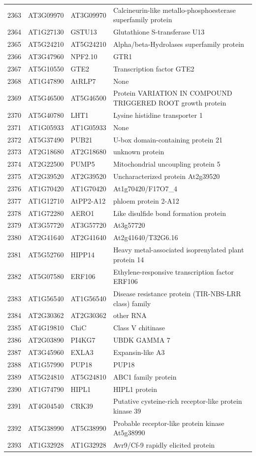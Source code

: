 \documentclass[11pt]{article}
\begin{document}
\begin{center}
\begin{tabular}{rlll}
2363 & AT3G09970 & AT3G09970 & Calcineurin-like metallo-phosphoesterase superfamily protein\\
2364 & AT1G27130 & GSTU13 & Glutathione S-transferase U13\\
2365 & AT5G24210 & AT5G24210 & Alpha/beta-Hydrolases superfamily protein\\
2366 & AT3G47960 & NPF2.10 & GTR1\\
2367 & AT5G10550 & GTE2 & Transcription factor GTE2\\
2368 & AT1G47890 & AtRLP7 & None\\
2369 & AT5G46500 & AT5G46500 & Protein VARIATION IN COMPOUND TRIGGERED ROOT growth protein\\
2370 & AT5G40780 & LHT1 & Lysine histidine transporter 1\\
2371 & AT1G05933 & AT1G05933 & None\\
2372 & AT5G37490 & PUB21 & U-box domain-containing protein 21\\
2373 & AT2G18680 & AT2G18680 & unknown protein\\
2374 & AT2G22500 & PUMP5 & Mitochondrial uncoupling protein 5\\
2375 & AT2G39520 & AT2G39520 & Uncharacterized protein At2g39520\\
2376 & AT1G70420 & AT1G70420 & At1g70420/F17O7\_4\\
2377 & AT1G12710 & AtPP2-A12 & phloem protein 2-A12\\
2378 & AT1G72280 & AERO1 & Like disulfide bond formation protein\\
2379 & AT3G57720 & AT3G57720 & At3g57720\\
2380 & AT2G41640 & AT2G41640 & At2g41640/T32G6.16\\
2381 & AT5G52760 & HIPP14 & Heavy metal-associated isoprenylated plant protein 14\\
2382 & AT5G07580 & ERF106 & Ethylene-responsive transcription factor ERF106\\
2383 & AT1G56540 & AT1G56540 & Disease resistance protein (TIR-NBS-LRR class) family\\
2384 & AT2G30362 & AT2G30362 & other RNA\\
2385 & AT4G19810 & ChiC & Class V chitinase\\
2386 & AT2G03890 & PI4KG7 & UBDK GAMMA 7\\
2387 & AT3G45960 & EXLA3 & Expansin-like A3\\
2388 & AT1G57990 & PUP18 & PUP18\\
2389 & AT5G24810 & AT5G24810 & ABC1 family protein\\
2390 & AT1G74790 & HIPL1 & HIPL1 protein\\
2391 & AT4G04540 & CRK39 & Putative cysteine-rich receptor-like protein kinase 39\\
2392 & AT5G38990 & AT5G38990 & Probable receptor-like protein kinase At5g38990\\
2393 & AT1G32928 & AT1G32928 & Avr9/Cf-9 rapidly elicited protein\\
\end{tabular}
\end{center}
\end{document}
